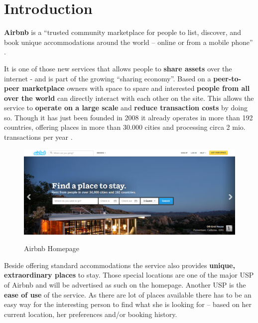 \section{Introduction} %
\label{sec:introduction}
{\bf Airbnb} is a ``trusted community marketplace for people to list, discover, and book unique accommodations around the world -- online or from a mobile phone'' \citep{Airbnb14a}.
\vspace{0.2cm}

It is one of those new services that allows people to {\bf share assets} over the internet - and is part of the growing ``sharing economy''. Based on a {\bf peer-to-peer marketplace} owners with space to spare and interested {\bf people from all over the world} can directly interact with each other on the site. This allows the service to {\bf operate on a large scale} and {\bf reduce transaction costs} by doing so. Though it has just been founded in 2008 it already operates in more than 192 countries, offering places in more than 30.000 cities and processing circa 2 mio. transactions per year \citep{Economist13}.

\vspace{0.5cm}
\begin{figure}[!ht]
    \center
        \includegraphics[width=1.0\textwidth]{assets/Airbnb_Homepage.png}
    \caption{Airbnb Homepage} 
    \citep{Airbnb14b}
    \label{fig:Airbnb_homepage}
\end{figure}

Beside offering standard accommodations the service also provides {\bf unique, extraordinary places} to stay. Those special locations are one of the major USP of Airbnb and will be advertised as such on the homepage. Another USP is the {\bf  ease of use} of the service. As there are lot of places available there has to be an easy way for the interesting person to find what she is looking for -- based on her current location, her preferences and/or booking history.
\vspace{0.2cm}

